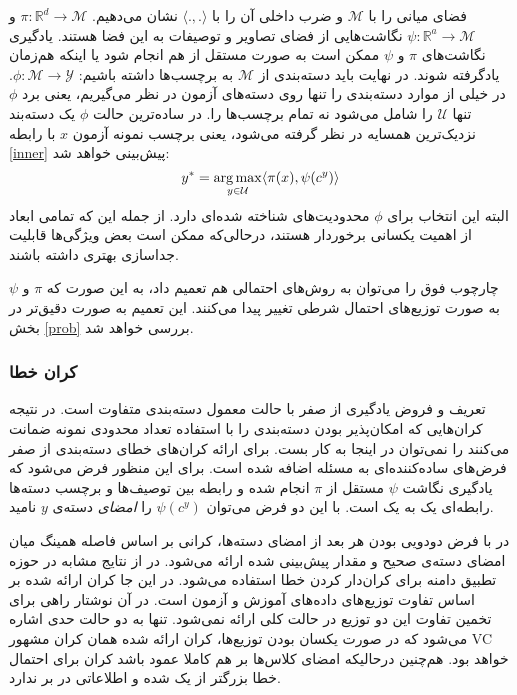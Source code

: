  فضای میانی را با $ \mathcal{M} $ و ضرب داخلی آن را با  $\langle ., . \rangle $ نشان می‌دهیم. 
 $ \pi : \mathbb{R}^d \to \mathcal{M}$ 
 و
 $ \psi : \mathbb{R}^a \to \mathcal{M}$ 
نگاشت‌هایی از فضای تصاویر و توصیفات به این فضا هستند. 
یادگیری نگاشت‌های  $\pi$ و $\psi$ ممکن است به صورت مستقل از هم انجام شود یا اینکه هم‌زمان یادگرفته شوند. در نهایت باید دسته‌بندی از  $ \mathcal{M} $ به برچسب‌ها داشته باشیم:
 $ \phi : \mathcal{M} \to \mathcal{Y}$.
 در خیلی از موارد دسته‌بندی را تنها روی دسته‌های آزمون در نظر می‌گیریم، یعنی برد $\phi$ تنها $ \mathcal{U}$ را شامل می‌شود نه تمام برچسب‌ها را.
در ساده‌ترین حالت $\phi$ یک دسته‌بند نزدیک‌ترین همسایه در نظر گرفته می‌شود، یعنی برچسب نمونه آزمون  $x$ با رابطه \ref{inner} پیش‌بینی خواهد شد:
\begin{equation}\label{inner}
y^* = \operatorname*{arg\,max}_{y \in \mathcal{U}} \langle \pi(x), \psi(c^y) \rangle
\end{equation}
البته این انتخاب برای  $\phi$ محدودیت‌های شناخته شده‌ای دارد. از جمله این که تمامی ابعاد از اهمیت یکسانی برخوردار هستند، درحالی‌که ممکن است بعض ویژگی‌ها قابلیت جداسازی بهتری داشته باشند. 

چارچوب فوق را می‌توان به روش‌های احتمالی هم تعمیم داد، به این صورت که $\pi$ و $\psi$ به صورت توزیع‌های احتمال شرطی تغییر پیدا می‌کنند. این تعمیم به صورت دقیق‌تر در بخش \ref{prob} بررسی خواهد شد. 


\subsubsection{کران خطا}\label{bound}
تعریف و فروض یادگیری از صفر با حالت معمول دسته‌بندی متفاوت است. در نتیجه کران‌هایی که امکان‌پذیر بودن دسته‌بندی را با استفاده تعداد محدودی نمونه ضمانت می‌کنند را نمی‌توان در اینجا به کار بست. برای ارائه کران‌های خطای دسته‌بندی از صفر فرض‌های ساده‌کننده‌ای به مسئله اضافه شده است. برای این منظور فرض می‌شود که یادگیری نگاشت $\psi$ مستقل از $\pi$ انجام شده و رابطه بین توصیف‌ها و برچسب دسته‌ها رابطه‌ای یک به یک است. با این دو فرض می‌توان $\psi(c^y) $ را \emph{ امضای}  دسته‌ی $y$ نامید. 

در \cite{hinton09} با فرض دودویی بودن هر بعد از امضای دسته‌ها، کرانی بر اساس فاصله همینگ 
میان امضای دسته‌ی صحیح و مقدار پیش‌بینی شده ارائه می‌شود. در \cite{emb} از نتایج مشابه در حوزه تطبیق دامنه برای کران‌دار کردن خطا استفاده می‌شود. در این جا کران ارائه شده بر اساس تفاوت توزیع‌های داده‌های آموزش و آزمون است. در آن نوشتار راهی برای تخمین تفاوت این دو توزیع در حالت کلی ارائه نمی‌شود. تنها به دو حالت حدی اشاره می‌شود که در صورت یکسان بودن توزیع‌ها، کران ارائه شده همان کران مشهور VC \cite{vapnik} خواهد بود. هم‌چنین درحالیکه امضای کلاس‌ها بر هم کاملا عمود باشد کران برای احتمال خطا بزرگتر از یک شده و اطلاعاتی در بر ندارد. 
